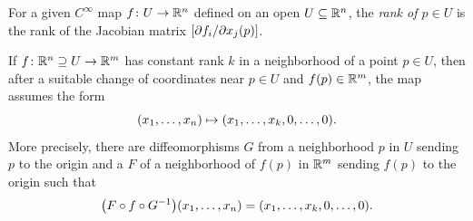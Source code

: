 \documentclass[letterpaper, 11pt, oneside]{book}
\begin{document}
\begin{defn}
  For a given $C^{\infty}$ map $f\colon U \to \mathbb{R}^{n}$ defined on an open $U \subseteq \mathbb{R}^{n}$, the \emph{rank of $p \in U$} is the rank of the Jacobian matrix $\bqty{\partial f_{i} / \partial x_{j}(p)}$.
\end{defn}

\begin{thrm}\label{thrm: constant_rank}
  If $f\colon \mathbb{R}^{n} \supseteq U \to \mathbb{R}^{m}$ has constant rank $k$ in a neighborhood of a point $p \in U$, then after a suitable change of coordinates near $p \in U$ and $f(p) \in \mathbb{R}^{m}$, the map assumes the form
  \[
    \pqty{x_{1}, \ldots, x_{n}} \mapsto \pqty{x_{1}, \ldots, x_{k}, 0, \ldots, 0}.
  \]
  More precisely, there are diffeomorphisms $G$ from a neighborhood $p$ in $U$ sending $p$ to the origin and a $F$ of a neighborhood of $f(p)$ in $\mathbb{R}^{m}$ sending $f(p)$ to the origin such that
  \[
    \pqty{F \circ f \circ G^{-1}}\pqty{x_{1}, \ldots, x_{n}} = \pqty{x_{1}, \ldots, x_{k}, 0, \ldots, 0}.
  \]
\end{thrm}
\end{document}
